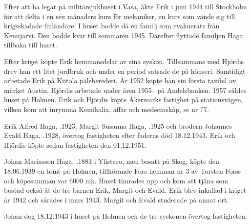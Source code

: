 Efter att ha legat på militärsjukhuset i Vasa, åkte Erik i juni 1944 till Stockholm för att delta i en sex månaders kurs för mekaniker, en kurs som vände sig till krigsskadade finländare. I huset bodde då en familj som evakuerats från Kemijärvi. Den bodde kvar till sommaren 1945. Därefter flyttade familjen Haga tillbaka till huset.

Efter kriget köpte Erik hemmansdelar av sina syskon. Tillsammans med Hjördis drev han ett litet jordbruk och under en period satsade de på  hönseri. Samtidigt arbetade Erik på Kiitola pälsberederi. År 1952 köpte han sin första taxibil av märket Austin. Hjördis arbetade under åren 1955-- på Andelsbanken. 1957 såldes huset på Holmen. Erik och Hjördis köpte Åkermarks fastighet på stationsvägen, vilken kom att inrymma Kemikalia, affär och medecinskåp, se nr 77.
\begin{jhchildren}
  \item {}
  \item {}
  \item {}
\end{jhchildren}


%
Erik Alfred Haga, .1923,  Margit Susanna Haga, .1925 och brodern Johannes Evald Haga, .1928, övertog fastigheten efter faderns död 18.12.1943. Erik och Hjördis köpte sedan fastigheten den 01.12.1951.


%
Johan Mariasson Haga, .1883 i Ylistaro, men bosatt på Skog, köpte den 18.06.1939 en tomt på Holmen, tillhörande Fors hemman nr 3 av Torsten Forss och köpesumman var 6000 mk. Huset timrades upp och kom att tjäna som bostad också åt de tre barnen Erik, Margit och Evald. Erik blev inkallad i kriget år 1942 och sårades i mars 1943. Margit och Evald studerade på annat ort.

Johan dog 18.12.1943 i huset på Holmen och de tre syskonen övertog fastigheten.



%


